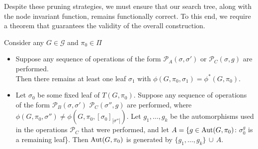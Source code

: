 Despite these pruning strategies, we must ensure that our search tree, along with the node invariant function, remains functionally correct. To this end, we require a theorem that guarantees the validity of the overall construction.

\vspace{0.4em}

\begin{theorem}\label{Theo: prunning}
    Consider any $G \mathrel{\in}\mathcal{G}$ and $\pi_0 \mathrel{\in}\Pi$
    \begin{itemize}
    \item Suppose any sequence of operations of the form $\mathcal{P}_A (\sigma, \sigma')$ or $\mathcal{P}_C (\sigma, g)$ are performed. \\ Then there remains at least one leaf $\sigma_1$ with $\phi(G,\pi_0, \sigma_1) = \phi^* (G,\pi_0)$.
    \item Let $\sigma_0$ be some ﬁxed leaf of $T (G, \pi_0)$. Suppose any sequence of operations of the form $\mathcal{P}_B (\sigma, \sigma')$ $\mathcal{P}_C (\sigma'', g)$ are performed, where $\phi(G,\pi_0, \sigma'') \neq\phi(G,\pi_0, {[\sigma_0]}_{|\sigma''|})$. Let $g_1, \ldots, g_k$ be the automorphisms
used in the operations $\mathcal{P}_C$ that were performed, and let $A = \{g \mathrel{\in}\operatorname{Aut}(G,\pi_0)$: $\sigma_0^g$ is a remaining leaf\}. Then $\operatorname{Aut}(G,\pi_0)$ is generated by $\{g_1, \ldots, g_k\} \,\cup\, A$.
\end{itemize}
\end{theorem}


